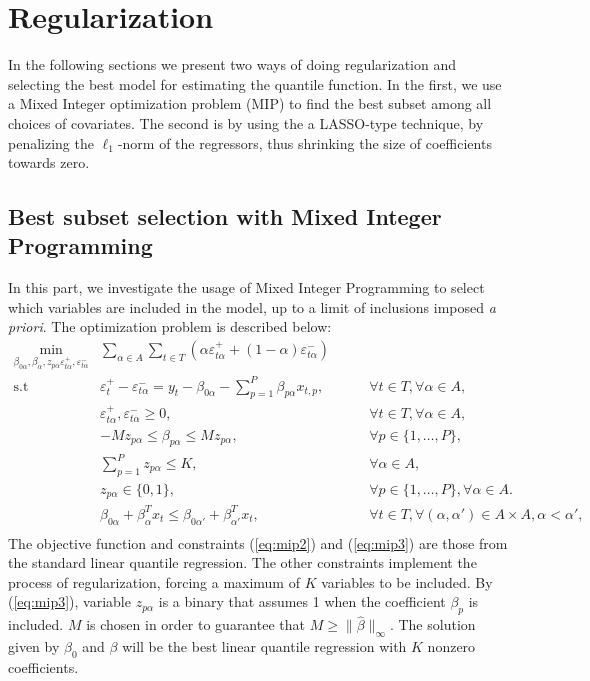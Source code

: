 \section{Regularization}

In the following sections we present two ways of doing regularization and selecting the best model for estimating the quantile function. In the first, we use a Mixed Integer optimization problem (MIP) to find the best subset among all choices of covariates. The second is by using the a LASSO-type technique, by penalizing the $\ell_1$-norm of the regressors, thus shrinking the size of coefficients towards zero.  

\subsection{Best subset selection with Mixed Integer Programming}
\label{sec:best-subset-mip}

In this part, we investigate the usage of Mixed Integer Programming to select which variables are included in the model, up to a limit of inclusions imposed \textit{a priori}. The optimization problem is described below:
\begin{eqnarray}
 \underset{\beta_{0\alpha},\beta_\alpha,z_{p \alpha} \varepsilon_{t \alpha}^{+},\varepsilon_{t \alpha}^{-}}{\text{min}} & \sum_{\alpha \in A} \sum_{t\in T}\left(\alpha\varepsilon_{t \alpha}^{+}+(1-\alpha)\varepsilon_{t\alpha}^{-}\right) \label{eq:mip0} \\
\mbox{s.t } & \varepsilon_{t}^{+}-\varepsilon_{t \alpha}^{-}=y_{t}-\beta_{0 \alpha}-\sum_{p=1}^{P}\beta_{p \alpha}x_{t,p},& \qquad\forall t \in T ,\forall \alpha \in A, \label{eq:mip1}\\
& \varepsilon_{t \alpha}^{+},\varepsilon_{t \alpha}^{-}\geq0,&\qquad\forall t \in T ,\forall \alpha \in A, \label{eq:mip2}\\
& - M z_{p \alpha} \leq \beta_{p \alpha} \leq M z_{p \alpha},&\qquad\forall p\in\{1,\dots,P\}, \label{eq:mip3}\\
& \sum_{p=1}^P z_{p \alpha} \leq K, & \qquad \forall \alpha \in A, \label{eq:mip4}\\
& z_{p \alpha} \in \{0,1\},&\qquad\forall p\in\{1,\dots,P\}, \forall \alpha \in A. \label{eq:mip5}\\
& \beta_{0\alpha} + \beta_{\alpha}^T x_{t} \leq \beta_{0\alpha'} + \beta_{\alpha'}^T x_{t}, & \qquad \forall t \in T, \forall (\alpha, \alpha') \in A \times A,  \alpha < \alpha',\nonumber\\ \label{eq:mip6}
\end{eqnarray}
The objective function and constraints (\ref{eq:mip2}) and (\ref{eq:mip3}) are those from the standard linear quantile regression. The other constraints implement the process of regularization, forcing a maximum of $K$ variables to be included. By (\ref{eq:mip3}), variable $z_{p \alpha}$ is a binary that assumes 1 when the coefficient $\beta_p$ is included. $M$ is chosen in order to guarantee that $M \geq \|\hat{\beta}\|_{\infty}$. The solution given by $\beta_0$ and $\beta$ will be the best linear quantile regression with $K$ nonzero coefficients. 

